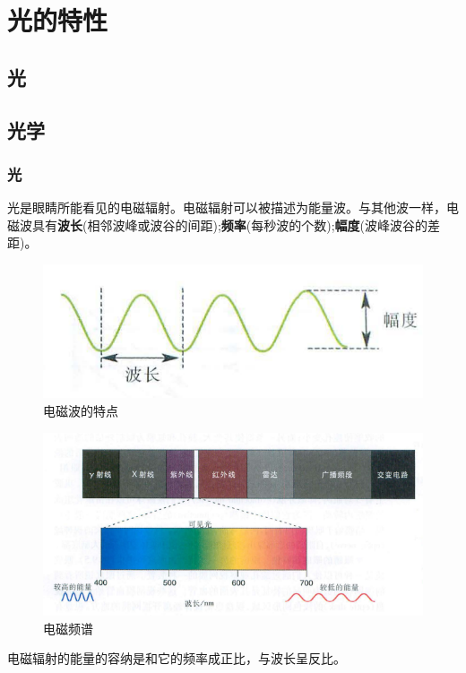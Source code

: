 \section{光的特性}
\subsection{光}
\subsection{光学}
\begin{frame}
    \frametitle{光}
    \scriptsize{光是眼睛所能看见的电磁辐射。电磁辐射可以被描述为能量波。与其他波一样，电磁波具有\textbf{波长}(相邻波峰或波谷的间距);\textbf{频率}(每秒波的个数);\textbf{幅度}(波峰波谷的差距)。}
    \begin{figure}
        \centering
        \includegraphics[height=0.2\textheight]{img/sec1-1.png}
        \caption{电磁波的特点\label{sec1-1}}
    \end{figure}
    \begin{figure}
        \centering
        \includegraphics[height=.3\textheight]{img/sec1-2.png}
        \caption{电磁频谱\label{sec1-2}}
    \end{figure}
    电磁辐射的能量的容纳是和它的频率成正比，与波长呈反比。
\end{frame}


